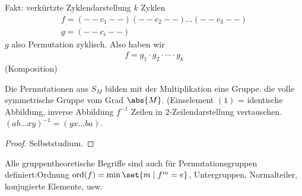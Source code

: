 Fakt: verkürtzte Zyklendarstellung $k$ Zyklen
\begin{align*}
	f = (--c_1--)(--c_2--)\dots (--c_3--)\\
	g = (--c_i--)
\end{align*}
$g$ also Permutation zyklisch.
Also haben wir
\begin{align*}
	f = g_1 \cdot g_2 \cdot \cdots \cdot g_k
\end{align*}
(Komposition)
\begin{proposition}
	Die Permutationen aus $S_M$ bilden mit der Multiplikation eine Gruppe. die volle symmetrische Gruppe vom Grad $\abs{M}$. (Einselement $(1)$ = identische Abbildung, inverse Abbildung $f^{-1}$ Zeilen in 2-Zeilendarstellung vertauschen. $(ab \dots xy)^{-1} = (yx\dots ba)$.
\end{proposition}
\begin{proof}
	Selbststudium.
\end{proof}
\begin{remark}
	Alle gruppentheoretische Begriffe sind auch für Permutationsgruppen definiert:Ordnung $\ord(f) = \min\set{m \mid f^m = e}$, Untergruppen, Normalteiler, konjugierte Elemente, usw.
\end{remark}